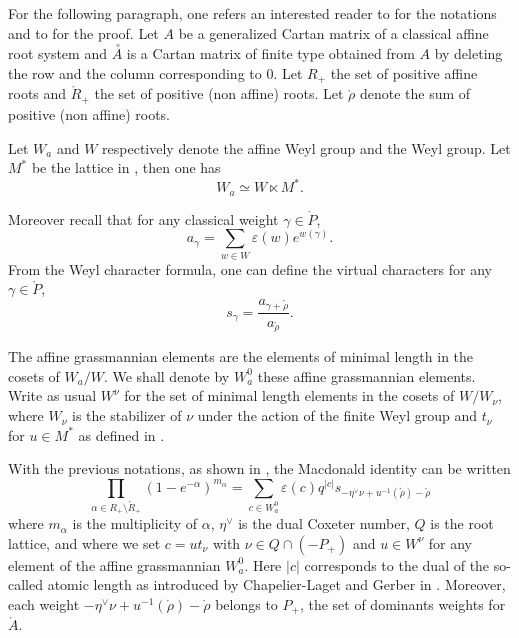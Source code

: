 \documentclass[11pt,letterpaper]{amsart}
\newcommand{\qu}[1]{\quad\text{#1}\quad}
\newcommand{\al}{\alpha}
\newcommand{\La}{\Lambda}
\newcommand{\os}[2]{\overset{#1}{#2}}
\numberwithin{equation}{section}
\numberwithin{df}{section}
\begin{document}
%
For the following paragraph, one refers an interested reader to \cite{carter_affine,KacB} for the notations and to \cite{LW} for the proof.
Let $A$ be a generalized Cartan matrix of a classical affine root system and $\os{\ \circ}{A}$ is a Cartan matrix of finite type obtained from $A$ by deleting the row and the column corresponding to $0$.
Let $R_+$ the set of positive affine roots and $\mathring{R}_{+}$ the set of positive (non affine) roots. Let $\mathring{\rho}$ denote the sum of positive (non affine) roots.

Let $W_a$ and $W$ respectively denote the affine Weyl group and the Weyl group. Let $M^{*}$ be the lattice in \cite[Section 20]{carter_affine}, then one has $$W_a\simeq W\ltimes M^{*}.$$ 

Moreover recall that for any classical weight $\gamma\in \mathring{P}$,
$$a_\gamma=\sum_{w\in W}\varepsilon(w)e^{w(\gamma)}.$$
From the Weyl character formula, one can define the virtual characters for any $\gamma\in \mathring{P}$,
$$s_\gamma=\frac{a_{\gamma+\mathring{\rho}}}{a_{\mathring{\rho}}}.$$

The affine grassmannian elements are the elements of minimal length in the cosets of $W_{a}/W$. We shall denote by $W_{a}^{0}$ these affine grassmannian elements. 
Write as usual $W^{\nu}$ for the set of minimal length elements in the cosets of
$W/W_{\nu}$, where $W_{\nu}$ is the stabilizer of $\nu$ under the action of the finite Weyl group and $t_\nu$ for $u\in M^{*}$ as defined in \cite[p.485]{carter_affine}.

	With the previous notations, as shown in \cite{LW}, the Macdonald identity can	be written
	\[
	\prod_{\alpha\in R_{+}\setminus\mathring{R}_{+}}(1-e^{-\alpha
})^{m_{\alpha}}=\sum_{c\in W_{a}^{0}}\varepsilon(c)q^{\left\vert c\right\vert }%
	s_{-\eta^{\vee}\nu+u^{-1}(\mathring{\rho})-\mathring{\rho}}%
	\]
	where $m_{\alpha}$ is the multiplicity of $\alpha$, $\eta^{\vee}$ is the dual Coxeter number, $Q$ is the root lattice, and where we set $c=ut_{\nu}$ with $\nu\in Q\cap(-P_{+})$ and $u\in W^{\nu}$ for
	any element of the affine grassmannian $W_{a}^{0}$. Here $\left\vert c\right\vert$ corresponds to the dual of the so-called atomic length as introduced by Chapelier-Laget and Gerber in \cite{CGT}. Moreover, each weight
	$-\eta^{\vee}\nu+u^{-1}(\mathring{\rho})-\mathring{\rho}$ belongs to $P_{+}$,
	the set of dominants weights for $\mathring{A}$.
\end{document}
